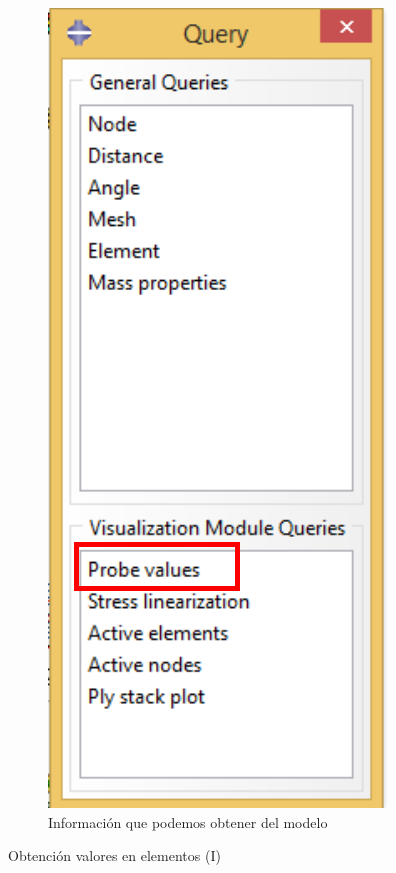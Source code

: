 \begin{enumerate}
\begin{figure}[H]
   \begin{subfigure}{0.32\textwidth}
     \includegraphics[width=\textwidth]{./body/images/imagen89.pdf}
     \caption{Información que podemos obtener del modelo}
     \label{figu89}
   \end{subfigure}%
   \caption{Obtención valores en elementos (I)}
 \end{figure}


\end{enumerate}
